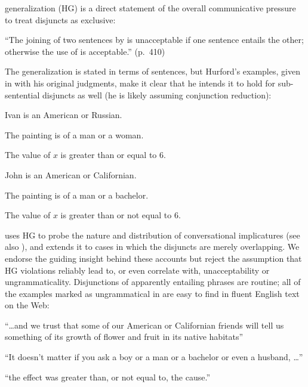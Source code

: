 \documentclass{article}
\begin{document}
 generalization (HG) is a direct statement of
the overall communicative pressure to treat disjuncts as exclusive:
%
\begin{examples}
\item\label{hg}%
  ``The joining of two sentences by  is unacceptable if one
  sentence entails the other; otherwise the use of  is
  acceptable.'' (p.~410)
\end{examples}
%
The generalization is stated in terms of sentences, but Hurford's
examples, given in  with his original judgments, make it clear
that he intends it to hold for sub-sentential disjuncts as well (he is
likely assuming conjunction reduction):
%
\begin{examples}
\item\label{hex}
  \begin{examples}
  \item Ivan is an American or Russian.
  \item The painting is of a man or a woman.
  \item The value of $x$ is greater than or equal to 6.
  \item\label{ex-bad1}\bad John is an American or Californian.
  \item\label{ex-bad2}\bad The painting is of a man or a bachelor.
  \item\label{ex-bad3}\bad The value of $x$ is greater than or not equal to 6.
  \end{examples}
\end{examples}

\citeauthor{Hurford:1974} uses HG to probe the nature and distribution
of conversational implicatures (see also
\citealt{Gazdar79b,ChierchiaFoxSpector08}), and \citet{Singh:2008}
extends it to cases in which the disjuncts are merely overlapping. We
endorse the guiding insight behind these accounts but reject the
assumption that HG violations reliably lead to, or even correlate
with, unacceptability or ungrammaticality. Disjunctions of apparently
entailing phrases are routine; all of the examples marked as
ungrammatical in  are easy to find in fluent English text on
the Web:
%
\begin{examples}
\item\label{hex-good}
  \begin{examples}
  \item ``\ldots and we trust that some of our American or Californian
    friends will tell us something of its growth of flower and fruit
    in its native habitats''
  \item ``It doesn't matter if you ask a boy or a man or a bachelor or
    even a husband, \ldots''
  \item ``the effect was greater than, or not equal to, the cause.''
  \end{examples}
\end{examples}
\end{document}
